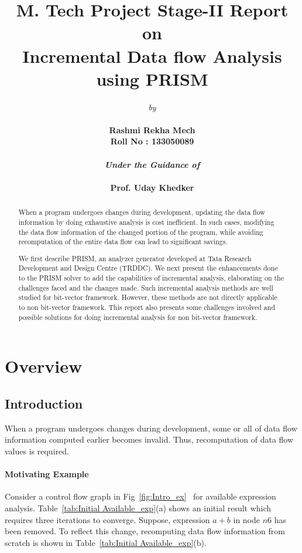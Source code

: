 \documentclass[11pt,a4paper,openright]{report}
\title{\textbf{M. Tech Project Stage-II Report}\\ on \\\textbf{Incremental Data flow Analysis using PRISM}}
\author{\emph{by}\\ \\ \bf{Rashmi Rekha Mech}\\\bf{Roll No : 133050089} \\
\\ \emph{Under the Guidance of}\\ \\\textbf{Prof. Uday Khedker}\\}
\date{}
\begin{document}
\maketitle
\begin{abstract}

When a program undergoes changes during development, updating the
data flow information by doing exhaustive analysis is cost inefficient. In such cases,
modifying the data flow information of the changed portion of the program, while avoiding recomputation of the entire 
data flow can lead to significant savings.

We first describe PRISM, an analyzer generator developed at Tata Research Development and Design Centre (TRDDC).
We next present the enhancements done to the PRISM solver to add the capabilities of incremental analysis, elaborating on the challenges faced and the changes made. 
Such incremental analysis methods are well studied for bit-vector framework. 
However, these methods are not directly applicable to non bit-vector framework. 
This report also presents some challenges involved and possible solutions for doing incremental analysis for non bit-vector framework.

\end{abstract}

\tableofcontents

\listoftables

\listoffigures

\cleardoublepage
\setcounter{page}{1}
\chapter{Overview}
\section{Introduction}
When a program undergoes changes during development, some or all of data flow information computed earlier becomes invalid.
Thus, recomputation of data flow values is required.
\subsubsection{Motivating Example}

Consider a control flow graph in Fig~\ref{fig:Intro_ex}~\cite{thesis_r} for available expression analysis. Table~\ref{tab:Initial Available_exp}(a) shows 
an initial result which requires three iterations to converge. Suppose, expression $a+b$ in node $n6$ has been removed. To reflect this change, recomputing
data flow information from scratch is shown in Table~\ref{tab:Initial Available_exp}(b). 
\end{document}
